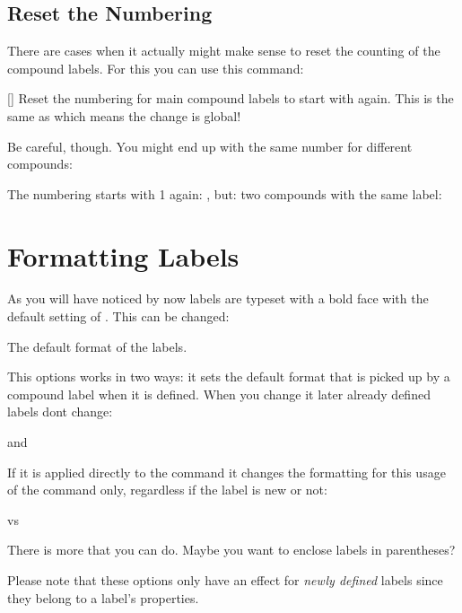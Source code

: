 \documentclass[load-preamble+,ngerman,british,american]{cnltx-doc}
\begin{document}
\subsection{Reset the Numbering}\label{sec:reset-numbering}

There are cases when it actually might make sense to reset the counting of the
compound labels.  For this you can use this command:
\begin{commands}
  []
    Reset the numbering for main compound labels to start with 
    again.  This is the same as
     which
    means the change is global!
\end{commands}

Be careful, though.  You might end up with the same number for different
compounds:
\begin{example}
   \resetcmpd The numbering starts with 1 again: , but:
    two compounds with the same label: 
\end{example}

\section{Formatting Labels}\label{sec:formatting-labels}

As you will have noticed by now labels are typeset with a bold face with the
default setting of \chemnum.  This can be changed:
\begin{options}
    The default format of the labels.
\end{options}

This options works in two ways: it sets the default format that is picked up
by a compound label when it is defined.  When you change it later already
defined labels dont change:
\begin{example}
   and 
\end{example}

If it is applied directly to the  command it changes the formatting
for this usage of the command only, regardless if the label is new or not:
\begin{example}
   vs
\end{example}

There is more that you can do.  Maybe you want to enclose labels in
parentheses?
\begin{example}
\end{example}
Please note that these options only have an effect for \emph{newly defined}
labels since they belong to a label's properties.
\end{document}
